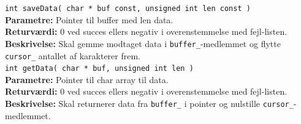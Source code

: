 \verb+int saveData( char * buf const, unsigned int len const )+ \\
\textbf{Parametre:} Pointer til buffer med len data. \\
\textbf{Returværdi:} 0 ved succes ellers negativ i overenstemmelse med fejl-listen. \\
\textbf{Beskrivelse:} Skal gemme modtaget data i \verb+buffer_+-medlemmet og flytte \verb+cursor_+ antallet af karakterer frem.\\

\verb+int getData( char * buf, unsigned int len )+ \\
\textbf{Parametre:} Pointer til char array til data. \\
\textbf{Returværdi:} 0 ved succes ellers negativ i overenstemmelse med fejl-listen. \\
\textbf{Beskrivelse:} Skal returnerer data fra \verb+buffer_+ i pointer og nulstille \verb+cursor_+-medlemmet.\\